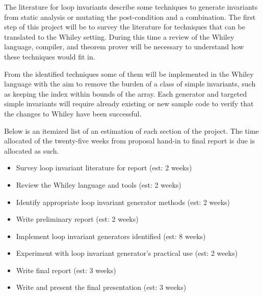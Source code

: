 \documentclass[11pt, a4paper, twoside, openright]{report}
\begin{document}
%

The literature for loop invariants describe some techniques to generate
invariants from static analysis or mutating the post-condition and a 
combination.
The first step of this project will be to survey the literature
for techniques that can be translated to the Whiley setting.
During this time a review of the Whiley language, compiler, and theorem prover
will be necessary to understand how these techniques would fit in.

From the identified techniques some of them will be implemented in the
Whiley language with the aim to remove the burden of a class of simple invariants,
such as keeping the index within bounds of the array.
Each generator and targeted simple invariants will require already existing
or new sample code to verify that the changes to Whiley have been successful.

Below is an itemized list of an estimation of each section of the project.
The time allocated of the twenty-five weeks from proposal hand-in to
final report is due is allocated as such. 

\begin{itemize}
    \item Survey loop invariant literature for report (est: 2 weeks) 
    \item Review the Whiley language and tools (est: 2 weeks)
    \item Identify appropriate loop invariant generator methods (est: 2 weeks)
    \item Write preliminary report (est: 2 weeks)
    \item Implement loop invariant generators identified (est: 8 weeks)
    \item Experiment with loop invariant generator's practical use (est: 2 weeks)
    \item Write final report (est: 3 weeks)
    \item Write and present the final presentation (est: 3 weeks)
\end{itemize}
\end{document}

